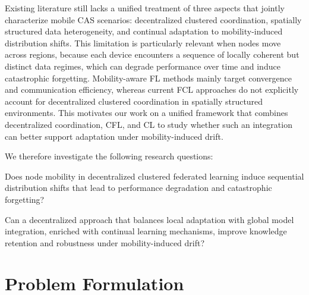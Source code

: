 \documentclass[conference]{IEEEtran}
\theoremstyle{plain}
\theoremstyle{definition}
\begin{document}
Existing literature still lacks a unified treatment of three aspects that 
 jointly characterize mobile \ac{CAS} scenarios: 
 decentralized clustered coordination, 
 spatially structured data heterogeneity, 
 and continual adaptation 
 to mobility-induced distribution shifts. 
% 
This limitation is particularly relevant when nodes move across regions, 
 because each device encounters a sequence of locally coherent but distinct 
 data regimes, 
 which can degrade performance over time and induce catastrophic 
 forgetting. 
Mobility-aware \ac{FL} methods mainly target convergence and communication 
 efficiency, 
 whereas current \ac{FCL} approaches do not explicitly account for 
 decentralized clustered coordination in spatially structured environments.
%
This motivates our work on a unified framework that combines decentralized 
 coordination, 
 \ac{CFL}, and \ac{CL} to study whether such an integration can 
 better support adaptation under mobility-induced drift.

We therefore investigate the following research questions:
\begin{questions}
    \item Does node mobility in decentralized clustered federated learning induce sequential distribution shifts that lead to performance degradation and catastrophic forgetting?\label{itm:rq1}
    \item Can a decentralized approach that balances local adaptation with global model integration,
     enriched with continual learning mechanisms, improve knowledge retention and robustness under mobility-induced drift?\label{itm:rq2}
\end{questions}

\section{Problem Formulation}\label{sec:formalization}
\end{document}
